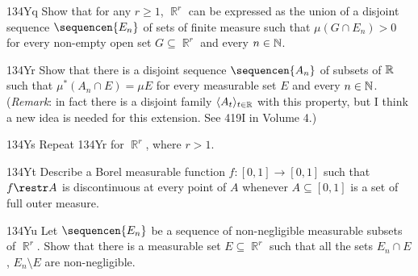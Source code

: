 {\spheader 134Yq Show that for any $r\ge 1$, $\BbbR^r$ can be
expressed as the union of a disjoint
sequence $\sequencen{E_n}$ of sets of finite measure such that
$\mu(G\cap E_n)>0$ for every non-empty open set $G\subseteq\BbbR^r$
and every $n\in\Bbb N$.
     
\spheader 134Yr Show that there is a disjoint sequence
$\sequencen{A_n}$ of subsets of $\Bbb R$ such that
$\mu^*(A_n\cap E)=\mu E$ for every measurable set $E$ and every
$n\in\Bbb N$.
({\it Remark\/}:  in fact there is a disjoint family
$\langle A_t\rangle_{t\in\Bbb R}$ with this property, but I think a new
idea is needed for this extension.   See 419I in Volume 4.)
     
\spheader 134Ys Repeat 134Yr for $\BbbR^r$,
where $r>1$.
     
\spheader 134Yt Describe a Borel measurable function $f:[0,1]\to[0,1]$
such that $f\restr A$ is discontinuous at every point of $A$ whenever
$A\subseteq[0,1]$ is a set of full outer measure.
     
\spheader 134Yu Let $\sequencen{E_n}$ be a sequence of non-negligible
measurable subsets of $\BbbR^r$.   Show that there is a measurable set
$E\subseteq\BbbR^r$ such that all the sets $E_n\cap E$, $E_n\setminus E$
are non-negligible.
}%
     
